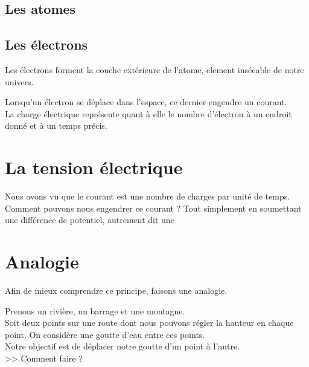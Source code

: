 \subsection{Les atomes}


\subsection{Les électrons}

Les électrons forment la couche extérieure de l'atome, element insécable de notre univers.


Lorsqu'un électron se déplace dans l'espace, ce dernier engendre un courant.\\



La charge électrique représente quant à elle le nombre d'électron à un endroit donné et à un temps précis.

\section{La tension électrique}

Nous avons vu que le courant est une nombre de charges par unité de temps. \\
Comment pouvons nous engendrer ce courant ? Tout simplement en soumettant une différence de potentiel, 
autrement dit une 

\section{Analogie}
\newcommand{\A}{$A~$~}
\newcommand{\B}{$B~$~}

Afin de mieux comprendre ce principe, faisons une analogie.

Prenons un rivière, un barrage et une montagne.\\

Soit deux points sur une route dont nous pouvons régler la hauteur en chaque point. On considère une goutte d'eau entre ces points. \\
Notre objectif est de déplacer notre goutte d'un point à l'autre.\\

>> Comment faire ?\\

